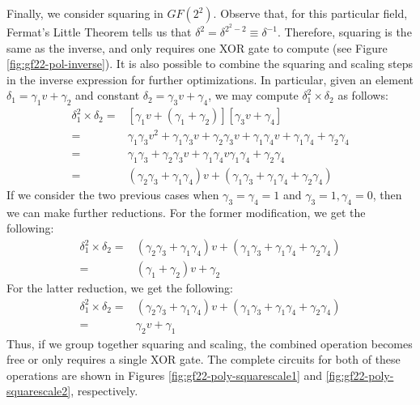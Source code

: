 Finally, we consider squaring in $GF(2^2)$. Observe that, for this particular field, Fermat's Little Theorem tells us that $\delta^2 = \delta^{2^2 - 2} \equiv \delta^{-1}$. Therefore, squaring is the same as the inverse, and only requires one XOR gate to compute (see Figure \ref{fig:gf22-pol-inverse}). It is also possible to combine the squaring and scaling steps in the inverse expression for further optimizations. In particular, given an element $\delta_1 = \gamma_1 v + \gamma_2$ and constant $\delta_2 = \gamma_3 v + \gamma_4$, we may compute $\delta_1^2 \times \delta_2$ as follows:
\begin{align*}
\delta_1^2 \times \delta_2 = & [\gamma_1 v + (\gamma_1 + \gamma_2)][\gamma_3 v + \gamma_4] \\
= & \gamma_1\gamma_3 v^2 + \gamma_1\gamma_3 v + \gamma_2\gamma_3 v + \gamma_1\gamma_4 v + \gamma_1\gamma_4 + \gamma_2\gamma_4 \\
= & \gamma_1\gamma_3 + \gamma_2\gamma_3 v + \gamma_1\gamma_4 v \gamma_1\gamma_4 + \gamma_2\gamma_4 \\
= & (\gamma_2\gamma_3 + \gamma_1\gamma_4) v + (\gamma_1\gamma_3 + \gamma_1\gamma_4 + \gamma_2\gamma_4) 
\end{align*}
If we consider the two previous cases when $\gamma_3 = \gamma_4 = 1$ and $\gamma_3 = 1, \gamma_4 = 0$, then we can make further reductions.
For the former modification, we get the following:
\begin{align*}
\delta_1^2 \times \delta_2 = & (\gamma_2\gamma_3 + \gamma_1\gamma_4) v + (\gamma_1\gamma_3 + \gamma_1\gamma_4 + \gamma_2\gamma_4) \\
= & (\gamma_1 + \gamma_2) v + \gamma_2
\end{align*}
For the latter reduction, we get the following:
\begin{align*}
\delta_1^2 \times \delta_2 = & (\gamma_2\gamma_3 + \gamma_1\gamma_4) v + (\gamma_1\gamma_3 + \gamma_1\gamma_4 + \gamma_2\gamma_4) \\
= & \gamma_2 v + \gamma_1
\end{align*}
Thus, if we group together squaring and scaling, the combined operation becomes free or only requires a single XOR gate. The complete circuits for both of these operations are shown in Figures \ref{fig:gf22-poly-squarescale1} and \ref{fig:gf22-poly-squarescale2}, respectively. 

